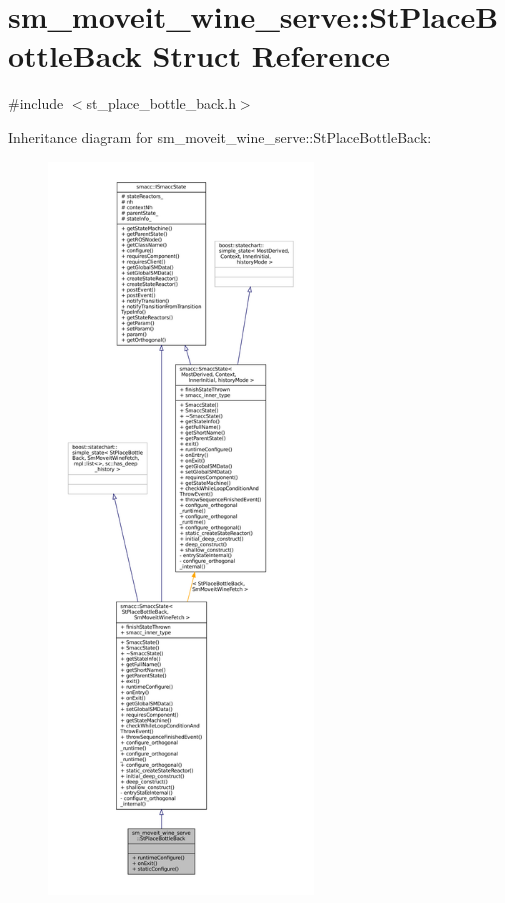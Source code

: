 \hypertarget{structsm__moveit__wine__serve_1_1StPlaceBottleBack}{}\section{sm\+\_\+moveit\+\_\+wine\+\_\+serve\+:\+:St\+Place\+Bottle\+Back Struct Reference}
\label{structsm__moveit__wine__serve_1_1StPlaceBottleBack}


{\ttfamily \#include $<$st\+\_\+place\+\_\+bottle\+\_\+back.\+h$>$}



Inheritance diagram for sm\+\_\+moveit\+\_\+wine\+\_\+serve\+:\+:St\+Place\+Bottle\+Back\+:
\nopagebreak
\begin{figure}[H]
\begin{center}
\leavevmode
\includegraphics[height=550pt]{structsm__moveit__wine__serve_1_1StPlaceBottleBack__inherit__graph}
\end{center}
\end{figure}


